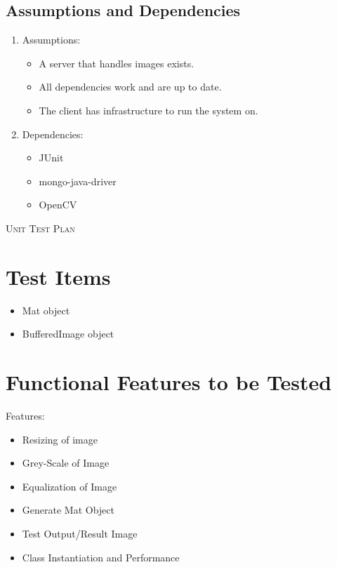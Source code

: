 \documentclass[a4paper,12pt]{report}
\begin{document}
	\newpage
	\subsection{Assumptions and Dependencies}
		\begin {enumerate}
			\item Assumptions:
			\begin {itemize}
				\item A server that handles images exists.
				\item All dependencies work and are up to date.
				\item The client has infrastructure to run the system on.
			\end {itemize}
				
			\item Dependencies:
			\begin {itemize}
				\item JUnit
				\item mongo-java-driver
				\item OpenCV
			\end {itemize}
		\end {enumerate}
\newpage
\begin{center}
	\textsc{\LARGE Unit Test Plan}\\[1.5cm]
\end{center}

\section {Test Items}		
	\begin{itemize}
		\item Mat object
		\item BufferedImage object 
	\end{itemize}

\section {Functional Features to be Tested}
\label{sec:Features}
	Features:
	\begin{itemize}
		\item Resizing of image
		\item Grey-Scale of Image
		\item Equalization of Image
		\item Generate Mat Object
		\item Test Output/Result Image
		\item Class Instantiation and Performance		
	\end{itemize}
\end{document}
